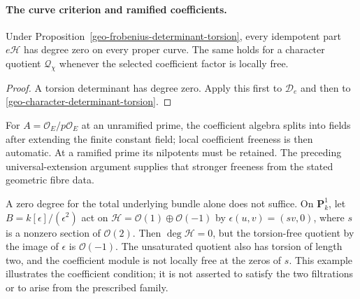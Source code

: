 \paragraph{The curve criterion and ramified coefficients.}
\begin{corollary}\label{geo-frobenius-character-degree}
Under Proposition~\ref{geo-frobenius-determinant-torsion}, every
idempotent part $e\mathcal H$ has degree zero on every proper curve.
The same holds for a character quotient $\mathcal Q_\chi$ whenever
the selected coefficient factor is locally free.
\end{corollary}
\begin{proof}
A torsion determinant has degree zero. Apply this first to
$\mathcal D_e$ and then to
\eqref{geo-character-determinant-torsion}.
\end{proof}

For $A=\mathcal O_E/p\mathcal O_E$ at an unramified prime,
the coefficient algebra splits into fields after extending the
finite constant field; local coefficient freeness is then automatic.
At a ramified prime its nilpotents must be retained. The preceding
universal-extension argument supplies that stronger freeness from
the stated geometric fibre data.

A zero degree for the total underlying bundle alone does not suffice.
On $\mathbf P^1_k$, let $B=k[\epsilon]/(\epsilon^2)$ act on
$\mathcal H=\mathcal O(1)\oplus\mathcal O(-1)$ by
$\epsilon(u,v)=(sv,0)$, where $s$ is a nonzero section of
$\mathcal O(2)$. Then $\deg\mathcal H=0$, but the torsion-free
quotient by the image of $\epsilon$ is $\mathcal O(-1)$.
The unsaturated quotient also has torsion of length two, and the
coefficient module is not locally free at the zeros of $s$.
This example illustrates the coefficient condition; it is not asserted
to satisfy the two filtrations or to arise from the prescribed family.
